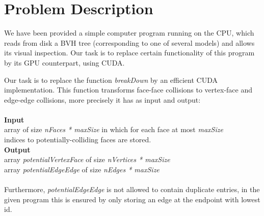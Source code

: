 \section{Problem Description}
We have been provided a simple computer program running on the CPU, which reads from disk a BVH tree (corresponding to one of several models) and allows
its visual inspection. Our task is to replace certain functionality of this program by its GPU counterpart, using CUDA.

Our task is to replace the function \textit{breakDown} by an efficient CUDA implementation. This function transforms face-face collisions to vertex-face and edge-edge collisions, more precisely it has as input and output:\\
\\
\indent \indent \textbf{Input}\\ 
\indent \indent array of size \textit{nFaces * maxSize} in which for each face at most \textit{maxSize}\\
\indent \indent indices to potentially-colliding faces are stored.\\
\indent \indent \textbf{Output}\\
\indent \indent array \textit{potentialVertexFace} of size \textit{nVertices * maxSize}\\
\indent \indent array \textit{potentialEdgeEdge} of size \textit{nEdges * maxSize}\\
\\
Furthermore, \textit{potentialEdgeEdge} is not allowed to contain duplicate entries, in the given program this is ensured by only storing an edge at the endpoint with lowest id. 
